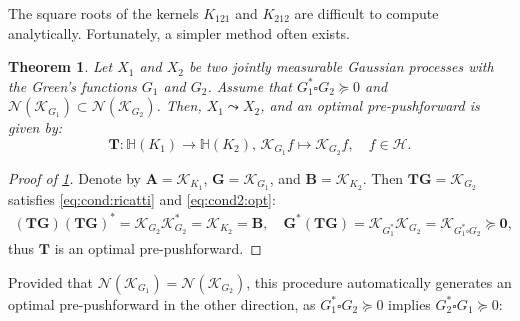\documentclass[noinfoline]{imsart}\setcounter{tocdepth}{2}
\renewcommand{\b}[1]{\mathbb{#1}} %
\newcommand{\m}[1]{\mathbf{#1}} %
\newcommand{\s}[1]{\mathscr{#1}} %
\renewcommand{\c}[1]{\mathcal{#1}} %
\theoremstyle{plain}
\newtheorem{theorem}{Theorem}[section]
\begin{document}
The square roots of the kernels $K_{121}$ and $K_{212}$ are difficult to compute analytically. Fortunately, a simpler method often exists. 

\begin{theorem}\label{thm:joint:Gauss}
Let $X_{1}$ and $X_{2}$ be two jointly measurable Gaussian processes with the Green's functions $G_{1}$ and $G_{2}$.
Assume that $G_{1}^{*} \square G_{2} \succeq 0$ and $\c{N}(\s{K}_{G_{1}}) \subset \c{N}(\s{K}_{G_{2}})$. Then, $X_{1} \leadsto X_{2}$, and an optimal pre-pushforward is given by:
\begin{equation*}
    \m{T}: \b{H}(K_{1}) \rightarrow \b{H}(K_{2}), \, \s{K}_{G_{1}} f \mapsto \s{K}_{G_{2}} f, \quad f \in \c{H}.
\end{equation*}
\end{theorem}



\begin{proof}[Proof of \cref{thm:joint:Gauss}]
Denote by $\m{A} = \s{K}_{K_{1}}$, $\m{G} = \s{K}_{G_{1}}$, and $\m{B} = \s{K}_{K_{2}}$. 
Then $\m{T} \m{G} = \s{K}_{G_{2}}$ satisfies \eqref{eq:cond:ricatti} and \eqref{eq:cond2:opt}:
\begin{align*}
    (\m{T} \m{G}) (\m{T} \m{G})^{*} = \s{K}_{G_{2}} \s{K}_{G_{2}}^{*} = \s{K}_{K_{2}} = \m{B}, \quad
    \m{G}^{*} (\m{T} \m{G}) = \s{K}_{G_{1}^{*}} \s{K}_{G_{2}} = \s{K}_{G_{1}^{*} \square G_{2}} \succeq \m{0},
\end{align*}
thus $\m{T}$ is an optimal pre-pushforward.
\end{proof}
Provided that $\c{N}(\s{K}_{G_{1}}) = \c{N}(\s{K}_{G_{2}})$, this procedure automatically generates an optimal pre-pushforward in the other direction, as $G_{1}^{*} \square G_{2} \succeq 0$ implies $G_{2}^{*} \square G_{1} \succeq 0$:
\end{document}
